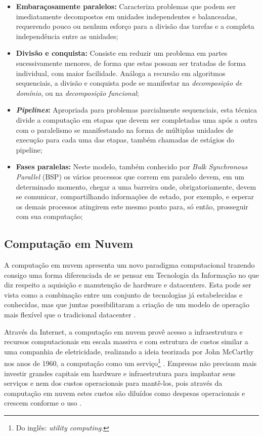 \documentclass[english,brazilian]{UNISINOSmonografia} %
\begin{document}
\begin{itemize}
	\item \textbf{Embaraçosamente paralelos:}
	Caracteriza problemas que podem ser imediatamente decompostos em unidades independentes e balanceadas, requerendo pouco ou nenhum esforço para a divisão das tarefas e a completa independência entre as unidades;
	
	\item \textbf{Divisão e conquista:} 
	Consiste em reduzir um problema em partes sucessivamente menores, de forma que estas possam ser tratadas de forma individual, com maior facilidade. 
	Análoga a recursão em algoritmos sequenciais, a divisão e conquista pode se manifestar na \textit{decomposição de domínio}, ou na \textit{decomposição funcional};
	
	\item \textbf{\textit{Pipelines}:}
	Apropriada para problemas parcialmente sequenciais, esta técnica divide a computação em etapas que devem ser completadas uma após a outra com o paralelismo se manifestando na forma de múltiplas unidades de execução para cada uma das etapas, também chamadas de estágios do pipeline;
	
	\item \textbf{Fases paralelas:}
	Neste modelo, também conhecido por \textit{Bulk Synchronous Parallel} (BSP) os vários processos que correm em paralelo devem, em um determinado momento, chegar a uma barreira onde, obrigatoriamente, devem se comunicar, compartilhando informações de estado, por exemplo, e esperar os demais processos atingirem este mesmo ponto para, só então, prosseguir com sua computação;
\end{itemize}

\subsection{Computação em Nuvem}
\label{sec:cloud}


A computação em nuvem apresenta um novo paradigma computacional trazendo consigo uma forma diferenciada de se pensar em Tecnologia da Informação no que diz respeito a aquisição e manutenção de hardware e datacenters. 
Esta pode ser vista como a combinação entre um conjunto de tecnologias já estabelecidas e conhecidas, mas que juntas possibilitaram a criação de um modelo de operação mais flexível que o tradicional datacenter \cite{Zhang2010}.

Através da Internet, a computação em nuvem provê acesso a infraestrutura e recursos computacionais em escala massiva e com estrutura de custos similar a uma companhia de eletricidade, realizando a ideia teorizada por John McCarthy nos anos de 1960, a computação como um serviço\footnote{
	Do inglês: \textit{utility computing}.
}
\cite{Zhang2010,Suleiman2012}.
Empresas não precisam mais investir grandes capitais em hardware e infraestrutura para implantar seus serviços e nem dos custos operacionais para mantê-los, pois através da computação em nuvem estes custos são diluídos como despesas operacionais e crescem conforme o uso \cite{Martin2011}.
\end{document}
